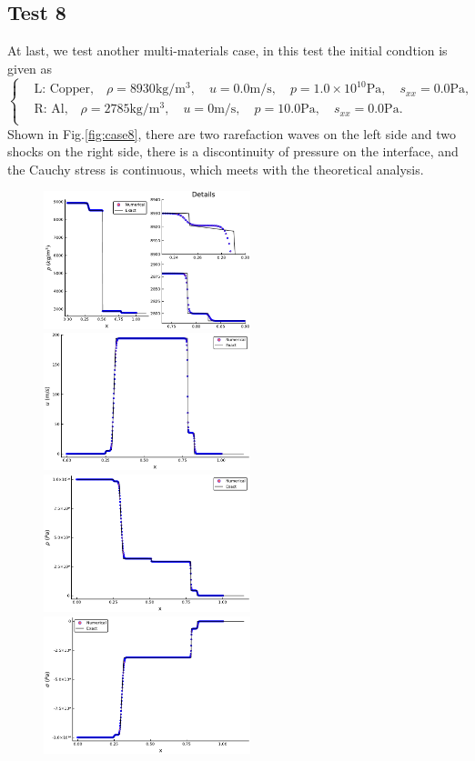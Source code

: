 \documentclass[review]{elsarticle}
\begin{document}
\begin{enumerate}[Step 1]
\subsection{Test 8}
At last, we test another multi-materials case, in this test the initial condtion is given as 
\begin{equation}
 \left\{ \begin{aligned}
	 &	 \text{L: Copper,}\quad  \rho = 8930 \text{kg}/\text{m}^3, \quad  u = 0.0\text{m}/\text{s}, \quad  p = 1.0\times 10^{10}\text{Pa}, \quad  s_{xx}=0.0 \text{Pa},\\
	 &	 \text{R: Al,}\quad  \rho = 2785 \text{kg}/\text{m}^3, \quad  u = 0\text{m}/\text{s}, \quad  p = 10.0 \text{Pa}, \quad  s_{xx}=0.0 \text{Pa}.\\
   \end{aligned}
 \right.
\end{equation}
Shown in Fig.\ref{fig:case8}, there are two rarefaction waves on the left side and two shocks on the right side, there is a discontinuity of pressure on the interface, and the Cauchy stress is continuous, which  meets with the theoretical analysis.  
\begin{figure}
  \centering
  \includegraphics[width= 6cm] {case8rho.pdf}
  \includegraphics[width= 6cm] {case8u.pdf}
  \includegraphics[width= 6cm] {case8p.pdf}
  \includegraphics[width= 6cm] {case8sigma.pdf}


\end{figure}
\end{enumerate}
\end{document}
